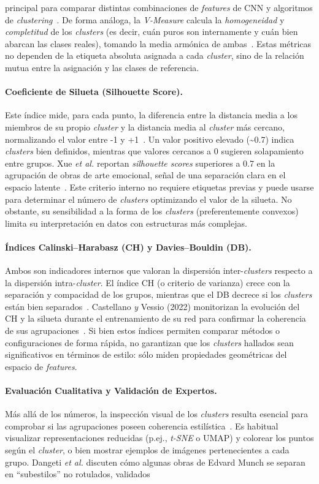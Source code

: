 principal para comparar distintas combinaciones de \textit{features} de CNN y algoritmos de \textit{clustering}~\cite{guerin2018}. De forma análoga, la \textit{V-Measure} calcula la \emph{homogeneidad} y \emph{completitud} de los \textit{clusters} (es decir, cuán puros son internamente y cuán bien abarcan las clases reales), tomando la media armónica de ambas~\cite{li2010}. Estas métricas no dependen de la etiqueta absoluta asignada a cada \textit{cluster}, sino de la relación mutua entre la asignación y las clases de referencia. \paragraph{Coeficiente de Silueta (Silhouette Score).} Este índice mide, para cada punto, la diferencia entre la distancia media a los miembros de su propio \textit{cluster} y la distancia media al \textit{cluster} más cercano, normalizando el valor entre -1 y +1~\cite{dangeti2024,gultepe2018}. Un valor positivo elevado (\textasciitilde 0.7) indica \textit{clusters} bien definidos, mientras que valores cercanos a 0 sugieren solapamiento entre grupos. Xue \textit{et al.} reportan \textit{silhouette scores} superiores a 0.7 en la agrupación de obras de arte emocional, señal de una separación clara en el espacio latente~\cite{gultepe2018}. Este criterio interno no requiere etiquetas previas y puede usarse para determinar el número de \textit{clusters} optimizando el valor de la silueta. No obstante, su sensibilidad a la forma de los \textit{clusters} (preferentemente convexos) limita su interpretación en datos con estructuras más complejas. \paragraph{Índices Calinski–Harabasz (CH) y Davies–Bouldin (DB).} Ambos son indicadores internos que valoran la dispersión inter-\textit{clusters} respecto a la dispersión intra-\textit{cluster}. El índice CH (o criterio de varianza) crece con la separación y compacidad de los grupos, mientras que el DB decrece si los \textit{clusters} están bien separados~\cite{dangeti2024}. Castellano \textit{y} Vessio (2022) monitorizan la evolución del CH y la silueta durante el entrenamiento de su red para confirmar la coherencia de sus agrupaciones~\cite{castellano2022}. Si bien estos índices permiten comparar métodos o configuraciones de forma rápida, no garantizan que los \textit{clusters} hallados sean significativos en términos de estilo: sólo miden propiedades geométricas del espacio de \textit{features}. \paragraph{Evaluación Cualitativa y Validación de Expertos.} Más allá de los números, la inspección visual de los \textit{clusters} resulta esencial para comprobar si las agrupaciones poseen coherencia estilística~\cite{gultepe2018}. Es habitual visualizar representaciones reducidas (p.ej., \textit{t-SNE} o UMAP) y colorear los puntos según el \textit{cluster}, o bien mostrar ejemplos de imágenes pertenecientes a cada grupo. Dangeti \textit{et al.} discuten cómo algunas obras de Edvard Munch se separan en “subestilos” no rotulados, validados 